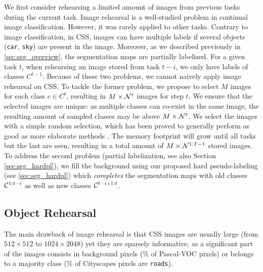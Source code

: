 We first consider rehearsing a limited amount of images from previous tasks during the current task.
Image rehearsal is a well-studied problem in continual image classification. However, it was rarely
applied to other tasks. Contrary to image classification, in \ac{CSS}, images can have multiple
labels if several objects (\eg \texttt{car}, \texttt{sky}) are present in the image. Moreover, as we
described previously in \autoref{sec:seg_overview}, the segmentation maps are partially labelized.
For a given task $t$, when rehearsing an image stored from task $t-i$, we only have labels of
classes $C^{t-1}$. Because of these two problems, we cannot naively apply image rehearsal on
\ac{CSS}. To tackle the former problem, we propose to select $M$ images for each class $c \in C^t$,
resulting in $M \times \mathcal{N}^t$ images for step $t$. We ensure that the selected images are unique:
as multiple classes can co-exist in the same image, the resulting amount of sampled classes may be
above $M \times \mathcal{N}^t$. We select the images with a simple random selection, which has been proved
to generally perform as good as more elaborate methods \citep{castro2018end_to_end_inc_learn}. The
memory footprint will grow until all tasks but the last are seen, resulting in a total amount of $M
    \times \mathcal{N}^{1:T-1}$ stored images. To address the second problem (partial labelization, see also
Section \ref{sec:seg_hardpl}), we fill the background using our proposed hard pseudo-labeling (see
\autoref{sec:seg_hardpl}) which \textit{completes} the segmentation maps with old classes
$\mathcal{C}^{1:t-i}$ as well as new classes $\mathcal{C}^{t-i+1:t}$.

\subsection{Object Rehearsal}
\label{sec:seg_object_rehearsal}

The main drawback of image rehearsal is that \ac{CSS} images are usually large (from $512\times 512$
to $1024 \times 2048$) yet they are sparsely informative, as a significant part of the images
consists in background pixels \citep{lin2017focalloss} (\% of Pascal-VOC
\citep{everingham2015pascalvoc} pixels) or belongs to a majority class (\% of Cityscapes
\citep{cordts2016cityscapes} pixels are \texttt{roads}).

